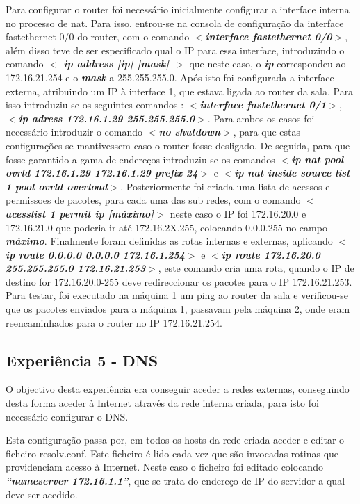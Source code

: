 \documentclass[a4paper]{article}
\begin{document}
Para configurar o router foi necessário inicialmente configurar a interface interna no processo de nat. Para isso, entrou-se na consola de configuração da interface fastethernet 0/0 do router, com o comando \textbf{\textit{$<$interface fastethernet 0/0$>$}}, além disso teve de ser especificado qual o IP para essa interface, introduzindo o comando\textbf{ \textit{$<$ ip address [ip] [mask] $>$}} que neste caso, o \textbf{\textit{ip}} correspondeu ao 172.16.21.254 e o \textbf{\textit{mask}} a 255.255.255.0.  Após isto foi configurada a interface externa, atribuindo um IP à interface 1, que estava ligada ao router da sala. Para isso introduziu-se os seguintes comandos : \textbf{\textit{$<$interface fastethernet 0/1$>$}}, \textbf{\textit{$<$ip adress 172.16.1.29 255.255.255.0$>$}}. Para ambos os casos foi necessário introduzir o comando \textbf{\textit{$<$no shutdown$>$}}, para que estas configurações se mantivessem caso o router fosse desligado. De seguida, para que fosse garantido a gama de endereços introduziu-se os comandos \textbf{\textit{$<$ip nat pool ovrld 172.16.1.29 172.16.1.29 prefix 24$>$}} e \textbf{\textit{$<$ip nat inside source list 1 pool ovrld overload$>$}}. Posteriormente foi criada uma lista de acessos e permissoes de pacotes, para cada uma das sub redes, com o comando \textbf{\textit{$<$acesslist 1 permit ip [máximo]$>$}} neste caso o IP foi 172.16.20.0 e 172.16.21.0 que poderia ir até 172.16.2X.255, colocando 0.0.0.255 no campo \textbf{\textit{máximo}}.
Finalmente foram definidas as rotas internas e externas, aplicando \textbf{\textit{$<$ip route 0.0.0.0
0.0.0.0 172.16.1.254$>$}} e \textbf{\textit{$<$ip route 172.16.20.0 255.255.255.0 172.16.21.253$>$}}, este comando cria uma rota, quando o IP de destino for 172.16.20.0-255 deve redireccionar os pacotes para o IP 172.16.21.253.
Para testar, foi executado na máquina 1 um ping ao router da sala e verificou-se que os pacotes enviados para a máquina 1, passavam pela máquina 2, onde eram reencaminhados para o router no IP 172.16.21.254.

\subsection{Experiência 5 - DNS}
O objectivo desta experiência era conseguir aceder a redes externas, conseguindo desta forma aceder à Internet através da rede interna criada, para isto foi necessário configurar o DNS. 

Esta configuração passa por, em todos os hosts da rede criada aceder e editar o ficheiro resolv.conf. Este ficheiro é lido cada vez que são invocadas rotinas que providenciam acesso à Internet. Neste caso o ficheiro foi editado colocando \textbf{\textit{“nameserver 172.16.1.1”}}, que se trata do endereço de IP do servidor a qual deve ser acedido.	
\end{document}
